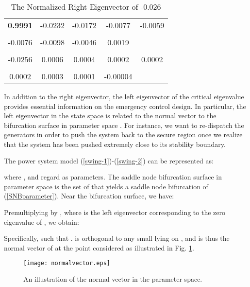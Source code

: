 \documentclass[journal]{IEEEtran}
\begin{document}
\begin{table}[!ht]
\centering
\caption{The Normalized Right Eigenvector of -0.026}\label{39-stbRE}
\begin{tabular}{|c|c|c|c|c|}
\hline
& &&&\\
\hline
\textbf{0.9991}&-0.0232&-0.0172&-0.0077&-0.0059\\
\hline
& &&&\\
\hline
-0.0076&-0.0098&-0.0046&0.0019&\\
\hline
&& &&\\
\hline
-0.0256&0.0006&0.0004&0.0002&0.0002\\
\hline
&& &&\\
\hline
0.0002&0.0003&0.0001&-0.00004&\\
\hline
\end{tabular}
\end{table}

In addition to the right eigenvector, the left eigenvector of the critical eigenvalue provides essential information on the emergency control design. In particular, the left eigenvector in the state space is related to the normal vector to the bifurcation surface in parameter space \cite{Cutsem:book}\cite{Dobson:1992}\cite{Dobson:1993}. For instance, we want to re-dispatch the generators in order to push the system back to the secure region once we realize that the system has been pushed extremely close to its stability boundary.

The power system model (\ref{swing-1})-(\ref{swing-2}) can be represented as:

where , and regard  as parameters. The saddle node bifurcation surface  in parameter space  is the set of  that yields a saddle node bifurcation of (\ref{SNBparameter}). Near the bifurcation surface, we have:

Premultiplying by , where  is the left eigenvector corresponding to the zero eigenvalue of , we obtain:

Specifically,  such that .  is orthogonal to any small  lying on , and is thus the normal vector of  at the point considered as illustrated in Fig. \ref{normal vector}.

\begin{figure}[!ht]
\centering
\texttt{[image: normalvector.eps]}\caption{An illustration of the normal vector  in the parameter space.}\label{normal vector}
\end{figure}
\end{document}
